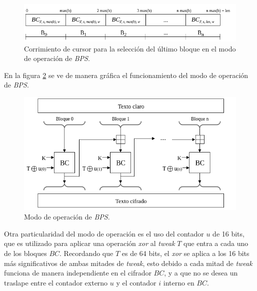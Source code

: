 \begin{figure}
  \begin{center}
    \includegraphics[width=0.8\linewidth]
    {../../../../diagramas_comunes/bps/cursor_bps}
    \caption{Corrimiento de cursor para la selección del último
      bloque en el modo de operación de \textit{BPS}.}
    \label{cursor_BPS}
   \end{center}
\end{figure}

En la figura \ref{modo_de_operacion_BPS} se ve de manera gráfica el
funcionamiento del modo de operación de \textit{BPS}.

\begin{figure}
  \begin{center}
    \includegraphics[width=0.85\linewidth]
    {../../../../diagramas_comunes/bps/modo_de_operacion_bps}
    \caption{Modo de operación de \textit{BPS}.}
    \label{modo_de_operacion_BPS}
   \end{center}
\end{figure}

Otra particularidad del modo de operación es el uso del contador $u$ de 16
bits, que es utilizado para aplicar una operación \textit{xor} al
\textit{tweak} $T$ que entra a cada uno de los bloques $BC$. Recordando que $T$
es de 64 bits, el \textit{xor} se aplica a los 16 bits más significativos de
ambas mitades de \textit{tweak}, esto debido a cada mitad de \textit{tweak}
funciona de manera independiente en el cifrador $BC$, y a que no se desea un
traslape entre el contador externo $u$ y el contador $i$ interno en $BC$.


